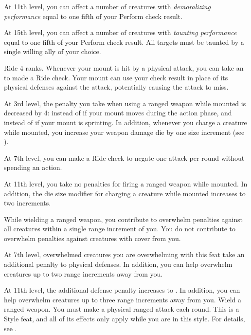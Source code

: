     At 11th level, you can affect a number of creatures with \textit{demoralizing performance} equal to one fifth of your Perform check result.

    At 15th level, you can affect a number of creatures with \textit{taunting performance} equal to one fifth of your Perform check result.
    All targets must be taunted by a single willing ally of your choice.

    \featpre Ride 4 ranks.
    \featben Whenever your mount is hit by a physical attack, you can take an  to made a Ride check.
    Your mount can use your check result in place of its physical defenses against the attack, potentially causing the attack to miss.

    At 3rd level, the penalty you take when using a ranged weapon while mounted is decreased by 4:  instead of  if your mount moves during the action phase, and  instead of  if your mount is sprinting.
    In addition, whenever you charge a creature while mounted, you increase your weapon damage die by one size increment (see ).

    At 7th level, you can make a Ride check to negate one attack per round without spending an action.

    At 11th level, you take no penalties for firing a ranged weapon while mounted.
    In addition, the die size modifier for charging a creature while mounted increases to two increments.

    \featben While wielding a ranged weapon, you contribute to overwhelm penalties against all creatures within a single range increment of you.
    You do not contribute to overwhelm penalties against creatures with cover from you.

    At 7th level, overwhelmed creatures you are overwhelming with this feat take an additional  penalty to physical defenses.
    In addition, you can help overwhelm creatures up to two range increments away from you.

    At 11th level, the additional defense penalty increases to .
    In addition, you can help overwhelm creatures up to three range increments away from you.
    \stylereq Wield a ranged weapon.
    You must make a physical ranged attack each round.
     This is a Style feat, and all of its effects only apply while you are in this style.
    For details, see .

